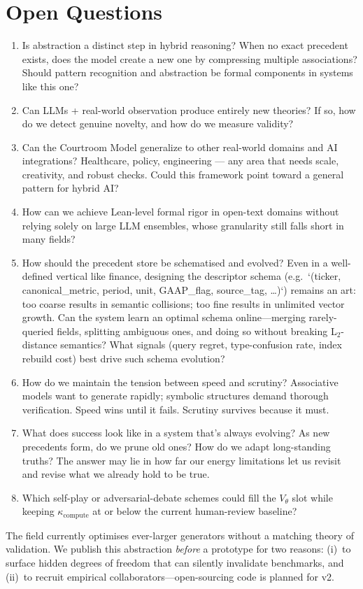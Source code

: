 \documentclass[11pt]{article}
\begin{document}
\section{Open Questions}
\label{sec:open-questions}
\begin{enumerate}
    \item Is abstraction a distinct step in hybrid reasoning? When no exact precedent exists, does the model create a new one by compressing multiple associations? Should pattern recognition and abstraction be formal components in systems like this one?
    \item Can LLMs + real-world observation produce entirely new theories? If so, how do we detect genuine novelty, and how do we measure validity?
    \item Can the Courtroom Model generalize to other real-world domains and AI integrations? Healthcare, policy, engineering — any area that needs scale, creativity, and robust checks. Could this framework point toward a general pattern for hybrid AI?
    \item How can we achieve Lean-level formal rigor in open-text domains without relying solely on large LLM ensembles, whose granularity still falls short in many fields?
    \item \label{open-question-schema} How should the precedent store be schematised and evolved? Even in a well-defined vertical like finance, designing the descriptor schema (e.g.\ `(ticker, canonical\_metric, period, unit, GAAP\_flag, source\_tag, …)`) remains an art: too coarse results in semantic collisions; too fine results in unlimited vector growth. Can the system learn an optimal schema online—merging rarely-queried fields, splitting ambiguous ones, and doing so without breaking L$_2$-distance semantics? What signals (query regret, type-confusion rate, index rebuild cost) best drive such schema evolution?
    \item How do we maintain the tension between speed and scrutiny? Associative models want to generate rapidly; symbolic structures demand thorough verification. Speed wins until it fails. Scrutiny survives because it must.
    \item What does success look like in a system that's always evolving? As new precedents form, do we prune old ones? How do we adapt long-standing truths? The answer may lie in how far our energy limitations let us revisit and revise what we already hold to be true.
    \item Which self-play or adversarial-debate schemes could fill the \(V_\theta\) slot while keeping \(\kappa_{\text{compute}}\) at or below the current human-review baseline?
\end{enumerate}
\begin{tcolorbox}[colback=gray!5,colframe=gray!40,title=Why a concept note?]
  The field currently optimises ever-larger generators without a matching theory of
  validation.  We publish this abstraction \emph{before} a prototype for two reasons:
  (i)~to surface hidden degrees of freedom that can silently invalidate benchmarks,
  and (ii)~to recruit empirical collaborators—open-sourcing code is planned for v2.
\end{tcolorbox}
\end{document}
